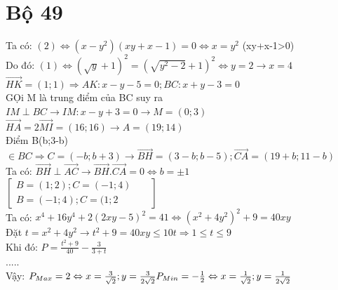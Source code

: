 \section{Bộ 49}
\hda 
Ta có: $(2)\Leftrightarrow \left ( x-y^{2} \right )\left ( xy+x-1 \right )=0\Leftrightarrow x=y^{2}$ \hspace{2mm}(xy+x-1>0)\\
Do đó: $(1)\Leftrightarrow \left ( \sqrt{y}+1 \right )^{2}=\left ( \sqrt{y^{2}-2}+1 \right )^{2}\Leftrightarrow y=2\rightarrow x=4$\\

\hda 
$\vec{HK}=(1;1)\Rightarrow AK:x-y-5=0;BC:x+y-3=0$\\

GỌi M là trung điểm của BC suy ra $IM\perp BC\rightarrow IM:x-y+3=0\rightarrow M=(0;3)$\\
$\vec{HA}=2\vec{MI}=(16;16)\rightarrow A=(19;14)$\\

Điểm B(b;3-b)$\in BC\Rightarrow C=(-b;b+3)\rightarrow \vec{BH}=(3-b;b-5);\vec{CA}=(19+b;11-b)$\\
Ta có: $\vec{BH}\perp \vec{AC}\rightarrow \vec{BH}.\vec{CA}=0\Leftrightarrow b=\pm 1$\\
$\begin{bmatrix}
B=(1;2);C=(-1;4) &  & \\ 
B=(-1;4);C=(1;2 &  & 
\end{bmatrix}$\\

\hda 
Ta có: $x^{4}+16y^{4}+2\left ( 2xy-5 \right )^{2}=41\Leftrightarrow \left ( x^{2}+4y^{2} \right )^{2}+9=40xy$\\
Đặt $t=x^{2}+4y^{2}\rightarrow t^{2}+9=40xy\leq 10t\Rightarrow 1\leq t\leq 9$\\
Khi đó: $P=\frac{t^{2}+9}{40}-\frac{3}{3+t}$\\
.....\\
Vậy: $P_{Max}=2\Leftrightarrow x=\frac{3}{\sqrt{2}};y=\frac{3}{2\sqrt{2}}\\
P_{Min}=-\frac{1}{2}\Leftrightarrow x=\frac{1}{\sqrt{2}};y=\frac{1}{2\sqrt{2}}$\\

